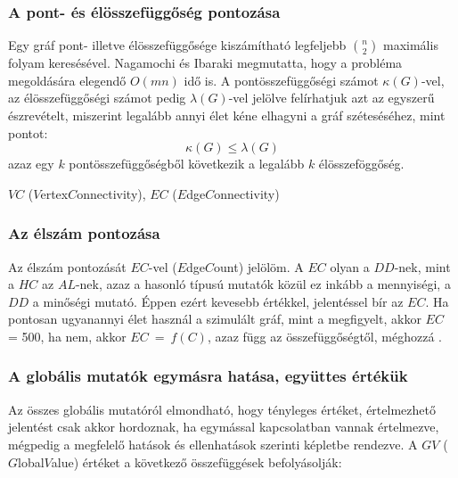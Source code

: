     \subsubsection{A pont- és élösszefüggőség pontozása}
    Egy gráf pont- illetve élösszefüggősége kiszámítható legfeljebb $\binom{n}{2}$ maximális folyam keresésével. Nagamochi és Ibaraki megmutatta, hogy a probléma megoldására elegendő $O(mn)$ idő is\cite{Nagamochi96}. A pontösszefüggőségi számot $\kappa(G)$-vel, az élösszefüggőségi számot pedig $\lambda(G)$-vel jelölve felírhatjuk azt az egyszerű észrevételt, miszerint legalább annyi élet kéne elhagyni a gráf széteséséhez, mint pontot: $$\kappa(G) \leq \lambda(G)$$ azaz egy $k$ pontösszefüggőségből következik a legalább $k$ élösszeföggőség.

     $VC$ ($V$ertex$C$onnectivity), $EC$ ($E$dge$C$onnectivity)
    \todo

    \subsubsection{Az élszám pontozása}
    Az élszám pontozását $EC$-vel ($E$dge$C$ount) jelölöm. A $EC$ olyan a $DD$-nek, mint a $HC$ az $AL$-nek, azaz a hasonló típusú mutatók közül ez inkább a mennyiségi, a $DD$ a minőségi mutató. Éppen ezért kevesebb értékkel, jelentéssel bír az $EC$. Ha pontosan ugyanannyi élet használ a szimulált gráf, mint a megfigyelt, akkor $EC$ = 500, ha nem, akkor $EC~=~f(C)$, azaz függ az összefüggőségtől, méghozzá .

    \subsubsection{A globális mutatók egymásra hatása, együttes értékük}
    Az összes globális mutatóról elmondható, hogy tényleges értéket, értelmezhető jelentést csak akkor hordoznak, ha egymással kapcsolatban vannak értelmezve, mégpedig a megfelelő hatások és ellenhatások szerinti képletbe rendezve. A $GV$ ($G$lobal$V$alue) értéket a következő összefüggések befolyásolják:
    \todo


